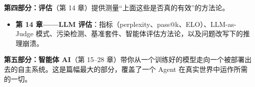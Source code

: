 \documentclass[11pt,a4paper,openany]{book}
\begin{document}
\textbf{第四部分：评估}（第 14 章）提供测量“上面这些是否真的有效”的方法论。

\begin{itemize}
  \item \textbf{第 14 章——LLM 评估}：指标（perplexity、pass@k、ELO）、LLM-as-Judge 模式、污染检测、基准套件、智能体评估方法论，以及问题改写下的推理崩溃。
\end{itemize}

\textbf{第五部分：智能体 AI}（第 15--28 章）带你从一个训练好的模型走向一个被部署出去的自主系统。这是篇幅最大的部分，覆盖了一个 Agent 在真实世界中运作所需的一切。
\end{document}

